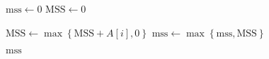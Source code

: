 
\begin{algorithm}[H]
  \begin{algorithmic}[1]
      \State $\text{mss} \gets 0$
      \State $\text{MSS} \gets 0$

      \hStatex
	\State $\text{MSS} \gets \max\left\{\text{MSS} + A[i], 0\right\}$
	\State $\text{mss} \gets \max\left\{\text{mss}, \text{MSS}\right\}$
      \EndFor

      \hStatex
      \State \Return $\text{mss}$
    \EndProcedure
  \end{algorithmic}
\end{algorithm}
